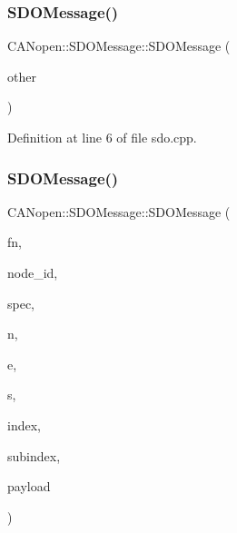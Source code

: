\mbox{\label{class_c_a_nopen_1_1_s_d_o_message_a73ab5aad06fd6a6f53fb614f4d9a8465}} 
\subsubsection{\texorpdfstring{S\+D\+O\+Message()}{SDOMessage()}\hspace{0.1cm}{\footnotesize\ttfamily [2/3]}}
{\footnotesize\ttfamily C\+A\+Nopen\+::\+S\+D\+O\+Message\+::\+S\+D\+O\+Message (\begin{DoxyParamCaption}\item[{const can\+\_\+frame \&}]{other }\end{DoxyParamCaption})}



Definition at line 6 of file sdo.\+cpp.

\mbox{\label{class_c_a_nopen_1_1_s_d_o_message_ad299429ca0de823d392fb24addf4fe85}} 
\subsubsection{\texorpdfstring{S\+D\+O\+Message()}{SDOMessage()}\hspace{0.1cm}{\footnotesize\ttfamily [3/3]}}
{\footnotesize\ttfamily C\+A\+Nopen\+::\+S\+D\+O\+Message\+::\+S\+D\+O\+Message (\begin{DoxyParamCaption}\item[{\hyperlink{class_c_a_nopen_1_1_message_a0f8f95e4ea1284011cd122629edc5468}{Function\+Code}}]{fn,  }\item[{uint8\+\_\+t}]{node\+\_\+id,  }\item[{\hyperlink{class_c_a_nopen_1_1_s_d_o_message_a87e867140acb008777fb9419626d19ea}{C\+CS}}]{spec,  }\item[{uint8\+\_\+t}]{n,  }\item[{uint8\+\_\+t}]{e,  }\item[{uint8\+\_\+t}]{s,  }\item[{uint16\+\_\+t}]{index,  }\item[{uint8\+\_\+t}]{subindex,  }\item[{\hyperlink{class_c_a_nopen_1_1_payload}{Payload}}]{payload }\end{DoxyParamCaption})}




